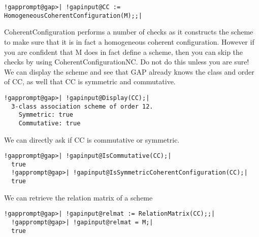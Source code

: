 \documentclass[a4paper,11pt]{report}
\begin{document}
{{\begin{Verbatim}[commandchars=!@|,fontsize=\small,frame=single,label=Example]
  !gapprompt@gap>| !gapinput@CC := HomogeneousCoherentConfiguration(M);;|
\end{Verbatim}
 CoherentConfiguration performs a number of checks as it constructs the scheme
to make sure that it is in fact a homogeneous coherent configuration. However
if you are confident that M does in fact define a scheme, then you can skip
the checks by using CoherentConfigurationNC. Do not do this unless you are
sure! We can display the scheme and see that \textsf{GAP} already knows the class and order of CC, as well that CC is symmetric and
commutative. 
\begin{Verbatim}[commandchars=!@|,fontsize=\small,frame=single,label=Example]
  !gapprompt@gap>| !gapinput@Display(CC);|
  3-class association scheme of order 12.
    Symmetric: true
    Commutative: true
\end{Verbatim}
 We can directly ask if CC is commutative or symmetric. 
\begin{Verbatim}[commandchars=!@|,fontsize=\small,frame=single,label=Example]
  !gapprompt@gap>| !gapinput@IsCommutative(CC);|
  true
  !gapprompt@gap>| !gapinput@IsSymmetricCoherentConfiguration(CC);|
  true
\end{Verbatim}
 We can retrieve the relation matrix of a scheme 
\begin{Verbatim}[commandchars=!@|,fontsize=\small,frame=single,label=Example]
  !gapprompt@gap>| !gapinput@relmat := RelationMatrix(CC);;|
  !gapprompt@gap>| !gapinput@relmat = M;|
  true
\end{Verbatim}
 
}}
\end{document}
